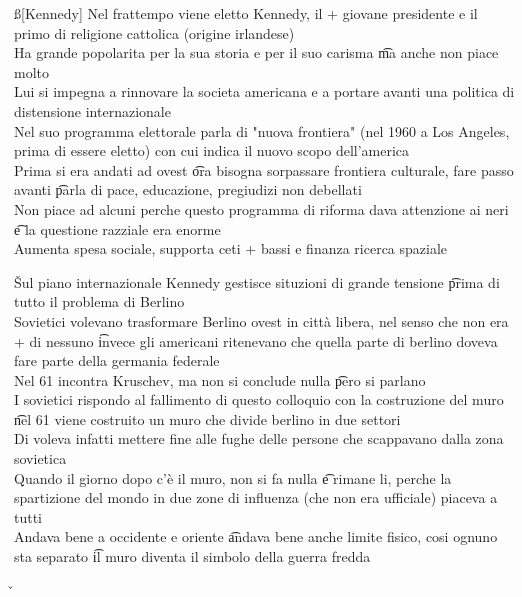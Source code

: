 \documentclass[12pt]{article}
\begin{document}
\ss[Kennedy]
Nel frattempo viene eletto Kennedy, il + giovane presidente e il primo di religione cattolica (origine irlandese) \\
Ha grande popolarita per la sua storia e per il suo carisma \t ma anche non piace molto \\
Lui si impegna a rinnovare la societa americana e a portare avanti una politica di distensione internazionale \\
Nel suo programma elettorale parla di "nuova frontiera" (nel 1960 a Los Angeles, prima di essere eletto) con cui indica il nuovo scopo dell'america \\
Prima si era andati ad ovest \t ora bisogna sorpassare frontiera culturale, fare passo avanti \t parla di pace, educazione, pregiudizi non debellati \\
Non piace ad alcuni perche questo programma di riforma dava attenzione ai neri \t e la questione razziale era enorme \\
Aumenta spesa sociale, supporta ceti + bassi e finanza ricerca spaziale

\v

Sul piano internazionale Kennedy gestisce situzioni di grande tensione \t prima di tutto il problema di Berlino \\
Sovietici volevano trasformare Berlino ovest in città libera, nel senso che non era + di nessuno \t invece gli americani ritenevano che quella parte di berlino doveva fare parte della germania federale \\
Nel 61 incontra Kruschev, ma non si conclude nulla \t pero si parlano \\
I sovietici rispondo al fallimento di questo colloquio con la costruzione del muro \t nel 61 viene costruito un muro che divide berlino in due settori \\
Di voleva infatti mettere fine alle fughe delle persone che scappavano dalla zona sovietica \\
Quando il giorno dopo c'è il muro, non si fa nulla \t e rimane li, perche la spartizione del mondo in due zone di influenza (che non era ufficiale) piaceva a tutti \\
Andava bene a occidente e oriente \t andava bene anche limite fisico, cosi ognuno sta separato \t il muro diventa il simbolo della guerra fredda

\v
\end{document}
